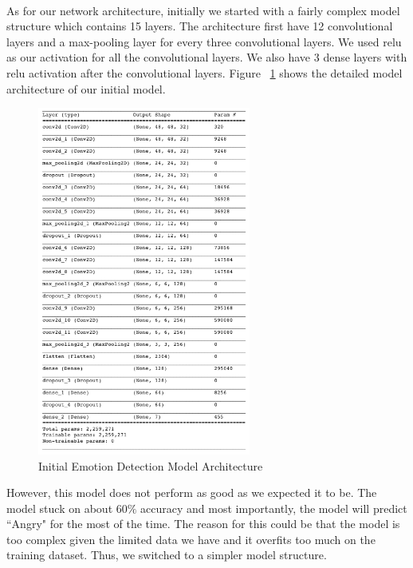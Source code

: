 \documentclass[10pt,twocolumn,letterpaper]{article}
\begin{document}
\\
As for our network architecture, initially we started with a fairly complex model structure which contains 15 layers. The architecture first have 12 convolutional layers and a max-pooling layer for every three convolutional layers. We used relu as our activation for all the convolutional layers. We also have 3 dense layers with relu activation after the convolutional layers. Figure ~\ref{fig:complex_model} shows the detailed model architecture of our initial model. 
\begin{figure}[h]
    \centering
    \includegraphics[width=7cm]{complex_model.png}
    \caption{Initial Emotion Detection Model Architecture}
    \label{fig:complex_model}
\end{figure}
However, this model does not perform as good as we expected it to be. The model stuck on about $60\%$ accuracy and most importantly, the model will predict ``Angry" for the most of the time. The reason for this could be that the model is too complex given the limited data we have and it overfits too much on the training dataset. Thus, we switched to a simpler model structure. 
\end{document}
